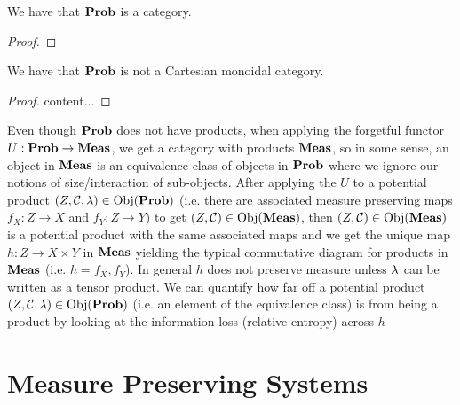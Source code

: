 \documentclass{book}
\begin{document}
	\begin{ex}
		We have that $\operatorname*{\text{\textbf{Prob}}}$ is a category.
	\end{ex}
	
	\begin{proof}
		
	\end{proof}
	
	\begin{ex}
		We have that $\operatorname*{\text{\textbf{Prob}}}$ is not a Cartesian monoidal category. 
	\end{ex}

	\begin{proof}
		content...
	\end{proof}
	
	Even though $\operatorname*{\text{\textbf{Prob}}}$ does not have products, when applying the forgetful functor $U: \operatorname*{\text{\textbf{Prob}}} \rightarrow \operatorname*{\text{\textbf{Meas}}}$, we get a category with products $\operatorname*{\text{\textbf{Meas}}}$, so in some sense, an object in $\operatorname*{\text{\textbf{Meas}}}$ is an equivalence class of objects in $\operatorname*{\text{\textbf{Prob}}}$ where we ignore our notions of size/interaction of sub-objects. After applying the $U$ to a potential product $(Z, \mathcal{C}, \lambda) \in \operatorname{Obj}(\operatorname*{\text{\textbf{Prob}}})$ (i.e. there are associated measure preserving maps $f_X:Z \rightarrow X$ and $f_Y:Z \rightarrow Y$) to get $(Z, \mathcal{C}) \in \operatorname{Obj}(\operatorname*{\text{\textbf{Meas}}})$, then $(Z, \mathcal{C}) \in \operatorname{Obj}(\operatorname*{\text{\textbf{Meas}}})$ is a potential product with the same associated maps and we get the unique map $h: Z \rightarrow X \times Y$ in $\operatorname*{\text{\textbf{Meas}}}$ yielding the typical commutative diagram for products in $\operatorname*{\text{\textbf{Meas}}}$ (i.e. $h = f_X, f_Y$). In general $h$ does not preserve measure unless $\lambda$ can be written as a tensor product. We can quantify how far off a potential product $(Z, \mathcal{C}, \lambda) \in \operatorname{Obj}(\operatorname*{\text{\textbf{Prob}}})$ (i.e. an element of the equivalence class) is from being a product by looking at the information loss (relative entropy) across $h$  
	
	
	
	
	
	
	
	
	
	
	
	
	
	
	
	
	
	
	
	
	
	
	
	
	
	
	
	
	
	
	\section{Measure Preserving Systems}
	
\end{document}
